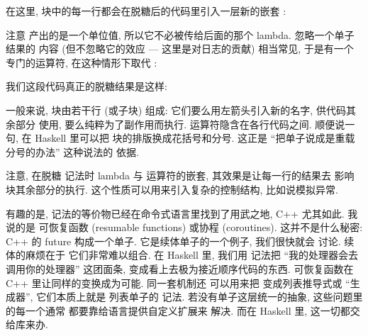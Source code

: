 在这里,  块中的每一行都会在脱糖后的代码里引入一层新的嵌套 :

注意  产出的是一个单位值, 所以它不必被传给后面的那个 lambda. 忽略一个单子结果的
内容 (但不忽略它的效应 --- 这里是对日志的贡献) 相当常见, 于是有一个专门的运算符, 在这种情形下取代
:

我们这段代码真正的脱糖结果是这样:

一般来说,  块由若干行 (或子块) 组成: 它们要么用左箭头引入新的名字, 供代码其余部分
使用, 要么纯粹为了副作用而执行.  运算符隐含在各行代码之间. 顺便说一句, 在 Haskell
里可以把  块的排版换成花括号和分号. 这正是 ``把单子说成是重载分号的办法'' 这种说法的
依据.

注意, 在脱糖  记法时 lambda 与  运算符的嵌套, 其效果是让每一行的结果去
影响  块其余部分的执行. 这个性质可以用来引入复杂的控制结构, 比如说模拟异常.

有趣的是,  记法的等价物已经在命令式语言里找到了用武之地, C++ 尤其如此. 我说的是
可恢复函数 (resumable functions) 或协程 (coroutines). 这并不是什么秘密: C++ 的
{future 构成一个单子}. 它是续体单子的一个例子, 我们很快就会
讨论. 续体的麻烦在于
它们非常难以组合. 在 Haskell 里, 我们用  记法把 ``我的处理器会去调用你的处理器''
这团面条, 变成看上去极为接近顺序代码的东西. 可恢复函数在 C++ 里让同样的变换成为可能. 同一套机制还
可以用来把
变成列表推导式或 ``生成器'', 它们本质上就是
列表单子的  记法. 若没有单子这层统一的抽象, 这些问题里的每一个通常
都要靠给语言提供自定义扩展来
解决. 而在 Haskell 里, 这一切都交给库来办.
